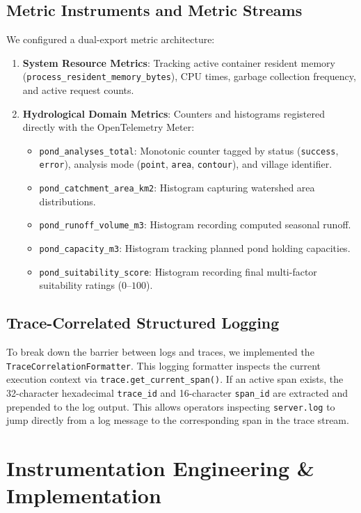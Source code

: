 \documentclass[11pt,a4paper]{article}
\begin{document}
\subsection{Metric Instruments and Metric Streams}
We configured a dual-export metric architecture:
\begin{enumerate}[leftmargin=*]
    \item \textbf{System Resource Metrics}: Tracking active container resident memory (\texttt{process\_resident\_memory\_bytes}), CPU times, garbage collection frequency, and active request counts.
    \item \textbf{Hydrological Domain Metrics}: Counters and histograms registered directly with the OpenTelemetry Meter:
    \begin{itemize}
        \item \texttt{pond\_analyses\_total}: Monotonic counter tagged by status (\texttt{success}, \texttt{error}), analysis mode (\texttt{point}, \texttt{area}, \texttt{contour}), and village identifier.
        \item \texttt{pond\_catchment\_area\_km2}: Histogram capturing watershed area distributions.
        \item \texttt{pond\_runoff\_volume\_m3}: Histogram recording computed seasonal runoff.
        \item \texttt{pond\_capacity\_m3}: Histogram tracking planned pond holding capacities.
        \item \texttt{pond\_suitability\_score}: Histogram recording final multi-factor suitability ratings ($0$--$100$).
    \end{itemize}
\end{enumerate}

\subsection{Trace-Correlated Structured Logging}
To break down the barrier between logs and traces, we implemented the \texttt{TraceCorrelationFormatter}. This logging formatter inspects the current execution context via \texttt{trace.get\_current\_span()}. If an active span exists, the 32-character hexadecimal \texttt{trace\_id} and 16-character \texttt{span\_id} are extracted and prepended to the log output. This allows operators inspecting \texttt{server.log} to jump directly from a log message to the corresponding span in the trace stream.

\section{Instrumentation Engineering \& Implementation}
\label{sec:implementation}
\end{document}
